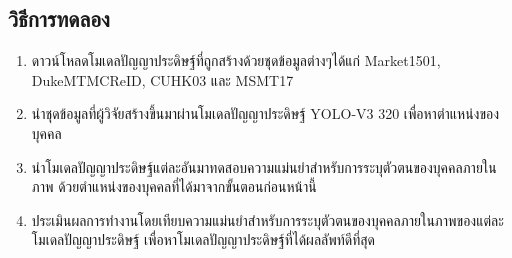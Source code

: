 \subsection*{วิธีการทดลอง}
	\begin{enumerate}
		\setlength\itemsep{-0.25em}
		\item ดาวน์โหลดโมเดลปัญญาประดิษฐ์ที่ถูกสร้างด้วยชุดข้อมูลต่างๆได้แก่ Market1501, DukeMTMCReID, CUHK03 และ MSMT17
		\item นำชุดข้อมูลที่ผู้วิจัยสร้างขึ้นมาผ่านโมเดลปัญญาประดิษฐ์ YOLO-V3 320 เพื่อหาตำแหน่งของบุคคล
		\item นำโมเดลปัญญาประดิษฐ์แต่ละอันมาทดสอบความแม่นยำสำหรับการระบุตัวตนของบุคคลภายในภาพ ด้วยตำแหน่งของบุคคลที่ได้มาจากขั้นตอนก่อนหน้านี้
		\item ประเมินผลการทำงานโดยเทียบความแม่นยำสำหรับการระบุตัวตนของบุคคลภายในภาพของแต่ละโมเดลปัญญาประดิษฐ์ เพื่อหาโมเดลปัญญาประดิษฐ์ที่ได้ผลลัพท์ดีที่สุด
\end{enumerate}
